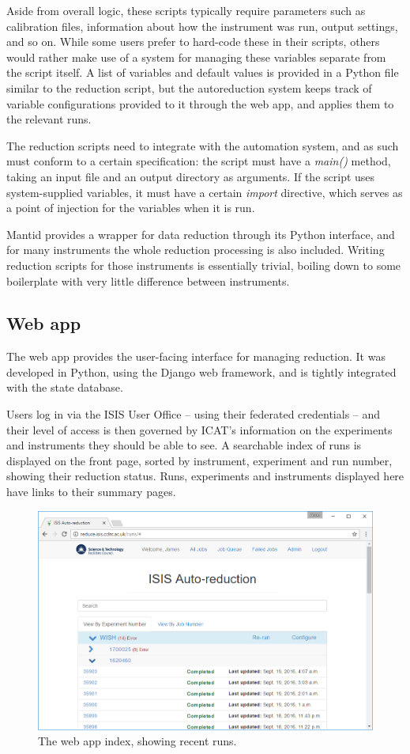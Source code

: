 \documentclass[twocolumn]{article}
\begin{document}
Aside from overall logic, these scripts typically require parameters
such as calibration files, information about how the instrument was run,
output settings, and so on. While some users prefer to hard-code these
in their scripts, others would rather make use of a system for managing
these variables separate from the script itself. A list of variables and
default values is provided in a Python file similar to the reduction
script, but the autoreduction system keeps track of variable
configurations provided to it through the web app, and applies them to
the relevant runs.

The reduction scripts need to integrate with the automation system, and
as such must conform to a certain specification: the script must have a
\emph{main()} method, taking an input file and an output directory as
arguments. If the script uses system-supplied variables, it must have a
certain \emph{import} directive, which serves as a point of injection
for the variables when it is run.

Mantid provides a wrapper for data reduction through its Python
interface, and for many instruments the whole reduction processing is
also included. Writing reduction scripts for those instruments is
essentially trivial, boiling down to some boilerplate with very little
difference between instruments.

\subsection{Web app}\label{web-app}

The web app provides the user-facing interface for managing reduction.
It was developed in Python, using the Django web framework, and is
tightly integrated with the state database.

Users log in via the ISIS User Office -- using their federated
credentials -- and their level of access is then governed by ICAT's
information on the experiments and instruments they should be able to
see. A searchable index of runs is displayed on the front page, sorted
by instrument, experiment and run number, showing their reduction
status. Runs, experiments and instruments displayed here have links to
their summary pages.

\begin{figure}
\centering\includegraphics[width=0.8\linewidth]{index.png}
\caption{The web app index, showing recent runs.}
\end{figure}
\end{document}
